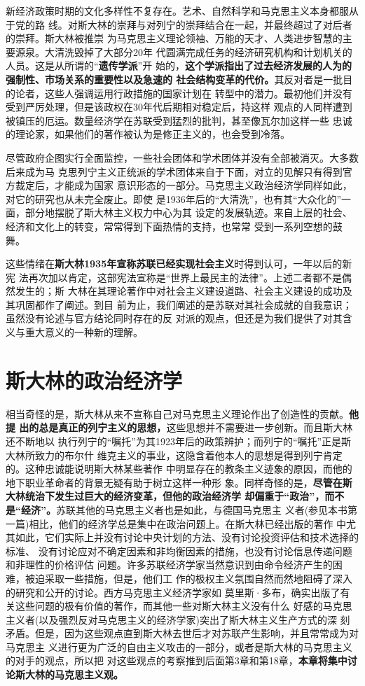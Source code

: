 新经济政策时期的文化多样性不复存在。艺术、自然科学和马克思主义本身都服从于党的路
线。对斯大林的崇拜与对列宁的崇拜结合在一起，并最终超过了对后者的崇拜。斯大林被推崇
为马克思主义理论领袖、万能的天才、人类进步智慧的主要源泉。大清洗毁掉了大部分20年
代圆满完成任务的经济研究机构和计划机关的人员。这是从所谓的“\textbf{遗传学派}”开
始的，\textbf{这个学派指出了过去经济发展的人为的强制性、市场关系的重要性以及急速的
  社会结构变革的代价。}其反对者是一批目的论者，这些人强调运用行政措施的国家计划在
转型中的潜力。最初他们并没有受到严厉处理，但是该政权在30年代后期相对稳定后，持这样
观点的人同样遭到被镇压的厄运。数量经济学在苏联受到猛烈的批判，甚至像瓦尔加这样一些
忠诚的理论家，如果他们的著作被认为是修正主义的，也会受到冷落。

尽管政府企图实行全面监控，一些社会团体和学术团体并没有全部被消灭。大多数后来成为马
克思列宁主义正统派的学术团体来自于下面，对立的见解只有得到官方裁定后，才能成为国家
意识形态的一部分。马克思主义政治经济学同样如此，对它的研究也从未完全废止。即使
是1936年后的“大清洗”，也有其“大众化的”一面，部分地摆脱了斯大林主义权力中心为其
设定的发展轨迹。来自上层的社会、经济和文化上的转变，常常得到下面热情的支持，也常常
受到一系列空想的鼓舞。

这些情绪在\textbf{斯大林1935年宣称苏联已经实现社会主义}时得到认可，一年以后的新宪
法再次加以肯定，这部宪法宣称是“世界上最民主的法律”。上述二者都不是偶然发生的；斯
大林在其理论著作中对社会主义建设道路、社会主义建设的成功及其巩固都作了阐述。到目
前为止，我们阐述的是苏联对其社会成就的自我意识；虽然没有论述与官方结论同时存在的反
对派的观点，但还是为我们提供了对其含义与重大意义的一种新的理解。

\section{斯大林的政治经济学}
相当奇怪的是，斯大林从来不宣称自己对马克思主义理论作出了创造性的贡献。\textbf{他提
  出的总是真正的列宁主义的思想，}这些思想并不需要进一步创新。而且斯大林还不断地以
执行列宁的“嘱托”为其1923年后的政策辨护；而列宁的“嘱托”正是斯大林所致力的布尔什
维克主义的事业，这隐含着他本人的思想是得到列宁肯定的。这种忠诚能说明斯大林某些著作
中明显存在的教条主义迹象的原因，而他的地下职业革命者的背景无疑有助于树立这样一种形
象。同样奇怪的是，\textbf{尽管在斯大林统治下发生过巨大的经济变革，但他的政治经济学
  却偏重于“政治”，而不是“经济”。}苏联其他的马克思主义者也是如此，与德国马克思主
义者(参见本书第一篇)相比，他们的经济学总是集中在政治问题上。在斯大林已经出版的著作
中尤其如此，它们实际上并没有讨论中央计划的方法、没有讨论投资评估和技术选择的标准、
没有讨论应对不确定因素和非均衡因素的措施，也没有讨论信息传递问题和非理性的价格评估
问题。许多苏联经济学家当然意识到由命令经济产生的困难，被迫采取一些措施，但是，他们工
作的极权主义氛围自然而然地阻碍了深入的研究和公开的讨论。西方马克思主义经济学家如
莫里斯·多布，确实出版了有关这些问题的极有价值的著作，而其他一些对斯大林主义没有什么
好感的马克思主义者(以及强烈反对马克思主义的经济学家)突出了斯大林主义生产方式的深
刻矛盾。但是，因为这些观点直到斯大林去世后才对苏联产生影响，并且常常成为对马克思主
义进行更为广泛的自由主义攻击的一部分，或者是斯大林的马克思主义的对手的观点，所以把
对这些观点的考察推到后面第3章和第18章，\textbf{本章将集中讨论斯大林的马克思主义观。}

